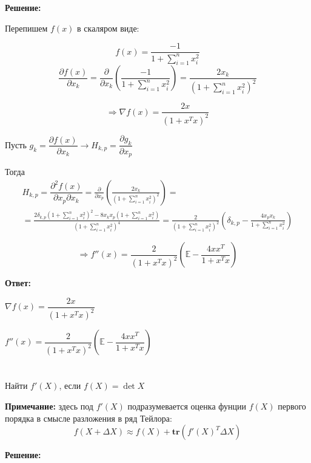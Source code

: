 \documentclass[a4paper,12pt]{article}
\newcommand{\lt}{\left}
\newcommand{\rt}{\right}
\newcommand{\p}{\partial}
\begin{document}
\vspace{\baselineskip}

\textbf{Решение:}

\vspace{\baselineskip}

Перепишем $f(x)$ в скаляром виде:


$$f(x) = \frac{-1}{1 + \sum\limits_{i=1}^n x_i^2} $$
$$\frac{\p f(x)}{\p x_k} = \frac{\p}{\p x_k}\lt(\frac{-1}{1 + \sum\limits_{i=1}^n x_i^2} \rt) = \frac{2x_k}{\lt(1 + \sum\limits_{i=1}^n x_i^2 \rt)^2}$$

$$\Rightarrow \nabla f(x) =  \frac{2{x}}{\lt(1 + {x}^T { x} \rt)^2}$$

Пусть $g_k = \dfrac{\p f(x)}{\p x_k} \rightarrow H_{k,p} = \dfrac{\p g_k}{\p x_p}$

Тогда 
\begin{multline}
H_{k,p} = \dfrac{\p^2 f(x)}{\p x_p \p x_k} = \frac{\p}{\p x_p}\lt(\frac{2x_k}{\lt(1 + \sum\limits_{i=1}^n x_i^2 \rt)^2}\rt) =\\= \frac{2\delta_{k,p}\lt(1 + \sum\limits_{i=1}^n x_i^2 \rt)^2 - 8x_kx_p\lt(1 + \sum\limits_{i=1}^n x_i^2 \rt)}{\lt(1 + \sum\limits_{i=1}^n x_i^2 \rt)^4} = \frac{2}{\lt(1 + \sum\limits_{i=1}^n x_i^2 \rt)^2}\lt(\delta_{k,p} - \frac{4x_p x_k}{1 + \sum\limits_{i=1}^n x_i^2} \rt)
\end{multline}

$$\Rightarrow f''(x) =  \frac{2}{\lt(1 + x^Tx\rt)^2}\lt(\mathbb{E} - \frac{4xx^T}{1 + x^Tx} \rt) $$

\textbf{Ответ:}

$\nabla f(x) =  \dfrac{2{x}}{\lt(1 + {x}^T { x} \rt)^2}$

$f''(x) =  \dfrac{2}{\lt(1 + x^Tx\rt)^2}\lt(\mathbb{E} - \dfrac{4xx^T}{1 + x^Tx} \rt)$


\section{}\label{ref_task_3}

Найти $f'(X)$, если $f(X) = \det X$

{\bf Примечание:} здесь под $f'(X)$ подразумевается оценка фунции $f(X)$ первого порядка в смысле разложения в ряд Тейлора:
     $$f(X + \Delta X) \approx f(X) + \mathbf{tr}(f'(X)^T \Delta X)$$


\vspace{\baselineskip}

\textbf{Решение:}
\end{document}
